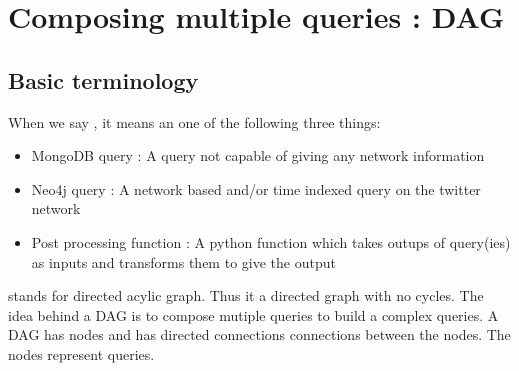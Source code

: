 \documentclass[letterpaper,10pt,english]{sphinxmanual}
\begin{document}
\chapter{Composing multiple queries : DAG}
\label{\detokenize{dag:composing-multiple-queries-dag}}\label{\detokenize{dag::doc}}

\section{Basic terminology}
\label{\detokenize{dag:basic-terminology}}
When we say , it means an one of the following three things:
\begin{itemize}
\item {} 
MongoDB query : A query not capable of giving any network information

\item {} 
Neo4j query : A network based and/or time indexed query on the twitter network

\item {} 
Post processing function : A python function which takes outups of query(ies) as inputs and transforms them to give the output

\end{itemize}

 stands for directed acylic graph. Thus it a directed graph with no cycles. The idea behind a DAG is to compose mutiple queries to build a complex queries. A DAG has nodes and has directed connections connections between the nodes. The nodes represent queries.
\end{document}
